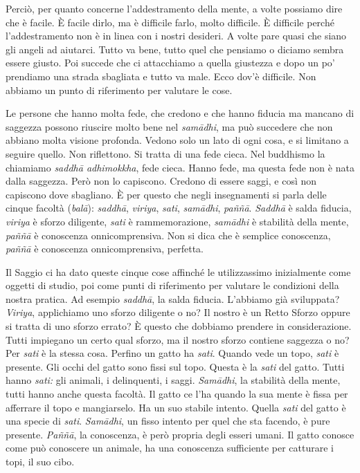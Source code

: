 Perciò, per quanto concerne l'addestramento della mente, a volte
possiamo dire che è facile. È facile dirlo, ma è difficile farlo, molto
difficile. È difficile perché l'addestramento non è in linea con i
nostri desideri. A volte pare quasi che siano gli angeli ad aiutarci.
Tutto va bene, tutto quel che pensiamo o diciamo sembra essere giusto.
Poi succede che ci attacchiamo a quella giustezza e dopo un po'
prendiamo una strada sbagliata e tutto va male. Ecco dov'è difficile.
Non abbiamo un punto di riferimento per valutare le cose.

Le persone che hanno molta fede, che credono e che hanno fiducia ma
mancano di saggezza possono riuscire molto bene nel \emph{samādhi}, ma
può succedere che non abbiano molta visione profonda. Vedono solo un
lato di ogni cosa, e si limitano a seguire quello. Non riflettono. Si
tratta di una fede cieca. Nel buddhismo la chiamiamo
\emph{saddhā adhimokkha}, fede cieca. Hanno fede, ma questa fede non è
nata dalla saggezza. Però non lo capiscono. Credono di essere saggi, e
così non capiscono dove sbagliano. È per questo che negli insegnamenti
si parla delle cinque facoltà (\emph{balā}):
\emph{saddhā}, \emph{viriya}, \emph{sati}, \emph{samādhi}, \emph{paññā}.
\emph{Saddhā} è salda fiducia, \emph{viriya} è sforzo diligente,
\emph{sati} è rammemorazione, \emph{samādhi} è stabilità della mente,
\emph{paññā} è conoscenza onnicomprensiva. Non si dica che è semplice
conoscenza, \emph{paññā} è conoscenza onnicomprensiva, perfetta.

Il Saggio ci ha dato queste cinque cose affinché le utilizzassimo
inizialmente come oggetti di studio, poi come punti di riferimento per
valutare le condizioni della nostra pratica. Ad esempio \emph{saddhā},
la salda fiducia. L'abbiamo già sviluppata? \emph{Viriya}, applichiamo
uno sforzo diligente o no? Il nostro è un Retto Sforzo oppure si tratta
di uno sforzo errato? È questo che dobbiamo prendere in considerazione.
Tutti impiegano un certo qual sforzo, ma il nostro sforzo contiene
saggezza o no? Per \emph{sati} è la stessa cosa. Perfino un gatto ha
\emph{sati}. Quando vede un topo, \emph{sati} è presente. Gli occhi del
gatto sono fissi sul topo. Questa è la \emph{sati} del gatto. Tutti
hanno \emph{sati:} gli animali, i delinquenti, i saggi. \emph{Samādhi},
la stabilità della mente, tutti hanno anche questa facoltà. Il gatto ce
l'ha quando la sua mente è fissa per afferrare il topo e mangiarselo. Ha
un suo stabile intento. Quella \emph{sati} del gatto è una specie di
\emph{sati}. \emph{Samādhi}, un fisso intento per quel che sta facendo,
è pure presente. \emph{Paññā}, la conoscenza, è però propria degli
esseri umani. Il gatto conosce come può conoscere un animale, ha una
conoscenza sufficiente per catturare i topi, il suo cibo.

